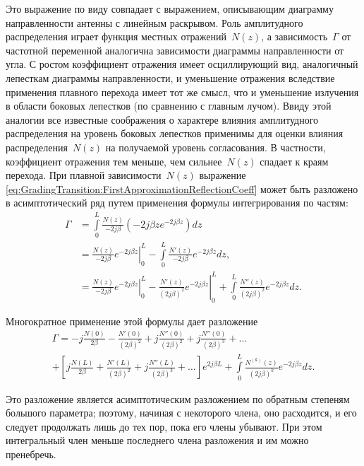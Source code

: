 Это выражение по виду совпадает с выражением, описывающим диаграмму
направленности антенны с линейным раскрывом. Роль амплитудного распределения
играет функция местных отражений~$N(z)$, а зависимость~$\Gamma$ от частотной
переменной аналогична зависимости диаграммы направленности от угла. С ростом
коэффициент отражения имеет осциллирующий вид, аналогичный лепесткам диаграммы
направленности, и уменьшение отражения вследствие применения плавного перехода
имеет тот же смысл, что и уменьшение излучения в области боковых лепестков
(по сравнению с главным лучом). Ввиду этой аналогии все известные соображения
о характере влияния амплитудного распределения на уровень боковых лепестков
применимы для оценки влияния распределения~$N(z)$ на получаемой уровень
согласования. В частности, коэффициент отражения тем меньше, чем сильнее~$N(z)$
спадает к краям перехода.
При плавной зависимости~$N(z)$ выражение \eqref{eq:GradingTransition:FirstApproximationReflectionCoeff} может быть разложено
в асимптотический ряд путем применения формулы интегрирования по частям:
\begin{align*}
    \Gamma
    &= \int\limits_0^L \frac{N(z)}{-2j\beta}
       \left( -2j \beta z e^{-2j\beta z} \right) dz \\
    &= \left.\frac{N(z)}{-2j\beta} e^{-2j\beta z} \right|_0^L -
       \int\limits_0^L \frac{N'(z)}{-2j\beta} e^{-2j\beta z} dz, \\
    &= \left.\frac{N(z)}{-2j\beta} e^{-2j\beta z} \right|_0^L -
       \left.\frac{N'(z)}{(2j\beta)^2} e^{-2j\beta z} \right|_0^L +
       \int\limits_0^L \frac{N''(z)}{(2j\beta)^2} e^{-2j\beta z} dz.
\end{align*}

Многократное применение этой формулы дает разложение
\begin{multline}
    \label{eq:GradingTransition:GammaSeries}
    \Gamma =
        -j\frac{N(0)}{2\beta}
        -\frac{N'(0)}{(2\beta)^2}
        +j\frac{N''(0)}{(2\beta)^2}
        +j\frac{N''(0)}{(2\beta)^3}
        + \ldots \\
        + \left[
            j\frac{N(L)}{2\beta}
            +\frac{N'(L)}{(2\beta)^2}
            +j\frac{N''(L)}{(2\beta)^3}
            +\ldots
        \right] e^{2j\beta L}
        + \int\limits_0^L \frac{N^{(k)}(z)}{(2j\beta)^k} e^{-2j\beta z}dz.
\end{multline}

Это разложение является асимптотическим разложением по обратным степеням
большого параметра; поэтому, начиная с некоторого члена, оно расходится, и его
следует продолжать лишь до тех пор, пока его члены убывают. При этом
интегральный член меньше последнего члена разложения  и им можно пренебречь.

